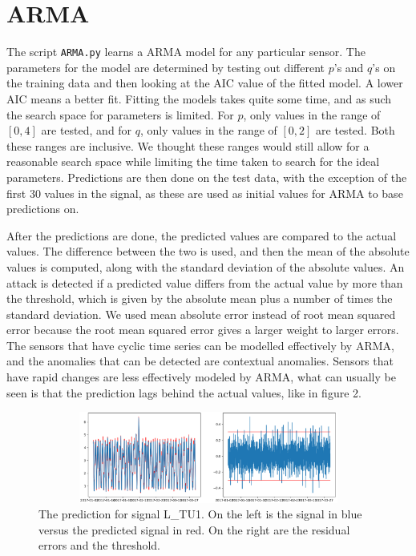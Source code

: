\documentclass[]{article}
\begin{document}
\clearpage
\section{ARMA}
The script \texttt{ARMA.py} learns a ARMA model for any particular sensor. The parameters for the model are determined by testing out different $p$'s and $q$'s on the training data and then looking at the AIC value of the fitted model. A lower AIC means a better fit. Fitting the models takes quite some time, and as such the search space for parameters is limited. For $p$, only values in the range of $[0, 4]$ are tested, and for $q$, only values in the range of $[0, 2]$ are tested. Both these ranges are inclusive. We thought these ranges would still allow for a reasonable search space while limiting the time taken to search for the ideal parameters. Predictions are then done on the test data, with the exception of the first 30 values in the signal, as these are used as initial values for ARMA to base predictions on.

After the predictions are done, the predicted values are compared to the actual values. The difference between the two is used, and then the mean of the absolute values is computed, along with the standard deviation of the absolute values. An attack is detected if a predicted value differs from the actual value by more than the threshold, which is given by the absolute mean plus a number of times the standard deviation. We used mean absolute error instead of root mean squared error because the root mean squared error gives a larger weight to larger errors. The sensors that have cyclic time series can be modelled effectively by ARMA, and the anomalies that can be detected are contextual anomalies. Sensors that have rapid changes are less effectively modeled by ARMA, what can usually be seen is that the prediction lags behind the actual values, like in figure 2. 
\begin{center}
\begin{figure}[H]
  \includegraphics[width=16cm, height=3cm]{./visuallizations/arma_3stddev_LTU1.png}
  \caption{The prediction for signal L\_TU1. On the left is the signal in blue versus the predicted signal in red. On the right are the residual errors and the threshold.}
  \label{signals}
\end{figure}
\end{center}
\end{document}
